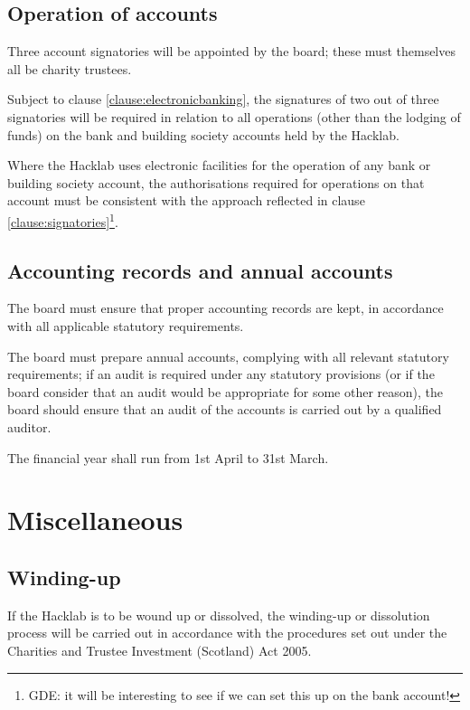 \documentclass{article}
\begin{document}
\subsection{Operation of accounts}

\clause Three account signatories will be appointed by the board;
these must themselves all be charity trustees.

\clause\label{clause:signatories}Subject to clause
\ref{clause:electronicbanking}, the signatures of two out of three
signatories will be required in relation to all
operations (other than the lodging of funds) on the bank and building
society accounts held by the Hacklab.

\clause\label{clause:electronicbanking}Where the Hacklab uses
electronic facilities for the operation of any bank or building
society account, the authorisations required for operations on that
account must be consistent with the approach reflected in clause
\ref{clause:signatories}\footnote{GDE: it will be interesting to see
  if we can set this up on the bank account!}.

\subsection{Accounting records and annual accounts}

\clause The board must ensure that proper accounting records are kept,
in accordance with all applicable statutory requirements.

\clause The board must prepare annual accounts, complying with all
relevant statutory requirements; if an audit is required under any
statutory provisions (or if the board consider that an audit would be
appropriate for some other reason), the board should ensure that an
audit of the accounts is carried out by a qualified auditor.

\clause The financial year shall run from 1st April to 31st March.

\section{Miscellaneous}

\subsection{Winding-up}

\clause  If the Hacklab is to be wound up or dissolved, the winding-up
or dissolution process will be carried out in accordance with the
procedures set out under the Charities and Trustee Investment
(Scotland) Act 2005.
\end{document}

